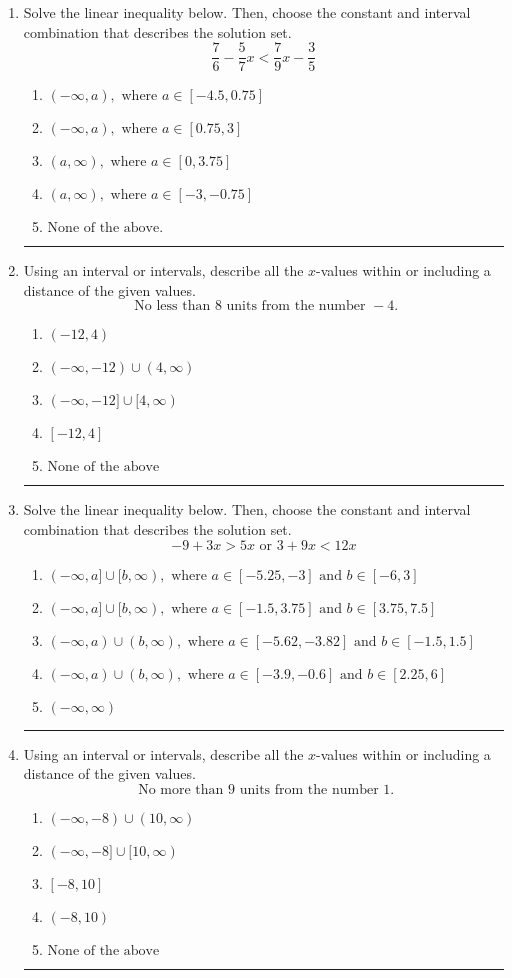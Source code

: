 \documentclass[14pt]{extbook}
\newcommand{\litem}[1]{\item#1\hspace*{-1cm}\rule{\textwidth}{0.4pt}}
\begin{document}
\begin{enumerate}
{\begin{enumerate}[label=\Alph*.]
\end{enumerate} }
\litem{
Solve the linear inequality below. Then, choose the constant and interval combination that describes the solution set.\[ \frac{7}{6} - \frac{5}{7} x < \frac{7}{9} x - \frac{3}{5} \]\begin{enumerate}[label=\Alph*.]
\item \( (-\infty, a), \text{ where } a \in [-4.5, 0.75] \)
\item \( (-\infty, a), \text{ where } a \in [0.75, 3] \)
\item \( (a, \infty), \text{ where } a \in [0, 3.75] \)
\item \( (a, \infty), \text{ where } a \in [-3, -0.75] \)
\item \( \text{None of the above}. \)

\end{enumerate} }
\litem{
Using an interval or intervals, describe all the $x$-values within or including a distance of the given values.\[ \text{ No less than } 8 \text{ units from the number } -4. \]\begin{enumerate}[label=\Alph*.]
\item \( (-12, 4) \)
\item \( (-\infty, -12) \cup (4, \infty) \)
\item \( (-\infty, -12] \cup [4, \infty) \)
\item \( [-12, 4] \)
\item \( \text{None of the above} \)

\end{enumerate} }
\litem{
Solve the linear inequality below. Then, choose the constant and interval combination that describes the solution set.\[ -9 + 3 x > 5 x \text{ or } 3 + 9 x < 12 x \]\begin{enumerate}[label=\Alph*.]
\item \( (-\infty, a] \cup [b, \infty), \text{ where } a \in [-5.25, -3] \text{ and } b \in [-6, 3] \)
\item \( (-\infty, a] \cup [b, \infty), \text{ where } a \in [-1.5, 3.75] \text{ and } b \in [3.75, 7.5] \)
\item \( (-\infty, a) \cup (b, \infty), \text{ where } a \in [-5.62, -3.82] \text{ and } b \in [-1.5, 1.5] \)
\item \( (-\infty, a) \cup (b, \infty), \text{ where } a \in [-3.9, -0.6] \text{ and } b \in [2.25, 6] \)
\item \( (-\infty, \infty) \)

\end{enumerate} }
\litem{
Using an interval or intervals, describe all the $x$-values within or including a distance of the given values.\[ \text{ No more than } 9 \text{ units from the number } 1. \]\begin{enumerate}[label=\Alph*.]
\item \( (-\infty, -8) \cup (10, \infty) \)
\item \( (-\infty, -8] \cup [10, \infty) \)
\item \( [-8, 10] \)
\item \( (-8, 10) \)
\item \( \text{None of the above} \)


\end{enumerate}}
\end{enumerate}
\end{document}
